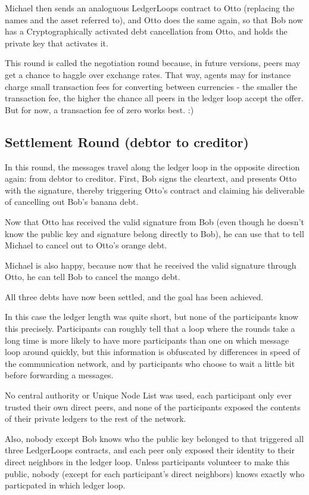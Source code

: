 \documentclass[11pt,twoside,a4paper]{article}
\begin{document}
Michael then sends an analoguous LedgerLoops contract to Otto (replacing the names and the asset referred to), and Otto does the
same again, so that Bob now has a Cryptographically activated debt cancellation from Otto, and holds the private key that activates it.

This round is called the negotiation round because, in future versions, peers may get a chance to haggle over exchange rates. That
way, agents may for instance charge small transaction fees for converting between currencies - the smaller the transaction fee,
the higher the chance all peers in the ledger loop accept the offer. But for now, a transaction fee of zero works best. :)

\subsection{Settlement Round (debtor to creditor)}

In this round, the messages travel along the ledger loop in the opposite direction again: from debtor to creditor.
First, Bob signs the
cleartext, and presents Otto with the signature, thereby triggering Otto's contract and claiming his deliverable of cancelling out
Bob's banana debt.

Now that Otto has received the valid signature from Bob (even though he doesn't know the public key and signature belong
directly to Bob),
he can use that to tell Michael to cancel out to Otto's orange debt.

Michael is also happy, because now that he received the valid signature through Otto, he can tell Bob to cancel the mango debt.

All three debts have now been settled, and the goal has been achieved.

In this case the ledger length was quite short, but none of the participants know this precisely. Participants can roughly tell that
a loop where the rounds take a long time is more likely to have more participants than one on which message loop around quickly,
but this information is obfuscated by differences in speed of the communication network, and by participants who choose to wait a
little bit before forwarding a messages.

No central authority or Unique Node List was used, each participant only ever trusted their own direct peers, and none of the participants
exposed the contents of their private ledgers to the rest of the network.

Also, nobody except Bob knows who the public key belonged to that triggered all three LedgerLoops contracts, and each peer only exposed
their identity to their direct neighbors in the ledger loop. Unless participants volunteer to make this public,
nobody (except for each participant's direct neighbors) knows exactly who particpated in which ledger loop.
\end{document}

